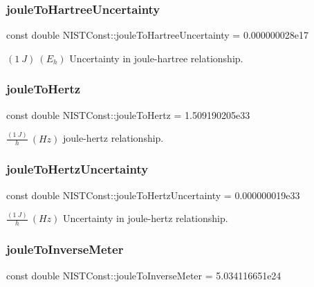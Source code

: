 \subsubsection{\texorpdfstring{joule\+To\+Hartree\+Uncertainty}{jouleToHartreeUncertainty}}
{\footnotesize\ttfamily const double N\+I\+S\+T\+Const\+::joule\+To\+Hartree\+Uncertainty = 0.\+000000028e17}

$(1\ J) \ (E_h)$ Uncertainty in joule-\/hartree relationship. \mbox{\label{group___n_i_s_t_const-_joule_ga6ac361417bc6b472bf80fcfef276d742}} 
\subsubsection{\texorpdfstring{joule\+To\+Hertz}{jouleToHertz}}
{\footnotesize\ttfamily const double N\+I\+S\+T\+Const\+::joule\+To\+Hertz = 1.\+509190205e33}

$\frac{(1\ J)}{h} \ (Hz)$ joule-\/hertz relationship. \mbox{\label{group___n_i_s_t_const-_joule_ga059f125fb7eede11c5b14b45349fe18e}} 
\subsubsection{\texorpdfstring{joule\+To\+Hertz\+Uncertainty}{jouleToHertzUncertainty}}
{\footnotesize\ttfamily const double N\+I\+S\+T\+Const\+::joule\+To\+Hertz\+Uncertainty = 0.\+000000019e33}

$\frac{(1\ J)}{h} \ (Hz)$ Uncertainty in joule-\/hertz relationship. \mbox{\label{group___n_i_s_t_const-_joule_gaa8de9ad07a642c1b9c1d4ee15125a917}} 
\subsubsection{\texorpdfstring{joule\+To\+Inverse\+Meter}{jouleToInverseMeter}}
{\footnotesize\ttfamily const double N\+I\+S\+T\+Const\+::joule\+To\+Inverse\+Meter = 5.\+034116651e24}

